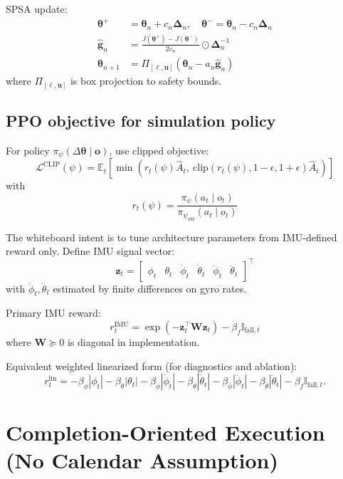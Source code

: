 \documentclass[11pt]{article}
\begin{document}
SPSA update:
\begin{align}
\boldsymbol{\theta}^{+}&=\boldsymbol{\theta}_n+c_n\boldsymbol{\Delta}_n,\quad
\boldsymbol{\theta}^{-}=\boldsymbol{\theta}_n-c_n\boldsymbol{\Delta}_n\\
\hat{\mathbf{g}}_n&=\frac{J(\boldsymbol{\theta}^{+})-J(\boldsymbol{\theta}^{-})}{2c_n}\odot\boldsymbol{\Delta}_n^{-1}\\
\boldsymbol{\theta}_{n+1}&=\Pi_{[\boldsymbol{\ell},\mathbf{u}]}\!\left(\boldsymbol{\theta}_n-a_n\hat{\mathbf{g}}_n\right)
\end{align}
where $\Pi_{[\boldsymbol{\ell},\mathbf{u}]}$ is box projection to safety bounds.

\subsection*{PPO objective for simulation policy}

For policy $\pi_{\psi}(\Delta\boldsymbol{\theta}\mid \mathbf{o})$, use clipped objective:
\begin{equation}
\mathcal{L}^{\mathrm{CLIP}}(\psi)=
\mathbb{E}_t\left[
\min\left(
r_t(\psi)\hat{A}_t,\ 
\mathrm{clip}(r_t(\psi),1-\epsilon,1+\epsilon)\hat{A}_t
\right)
\right]
\end{equation}
with
\[
r_t(\psi)=\frac{\pi_{\psi}(a_t\mid o_t)}{\pi_{\psi_{\mathrm{old}}}(a_t\mid o_t)}
\]

The whiteboard intent is to tune architecture parameters from IMU-defined reward only. Define IMU signal vector:
\[
\mathbf{z}_t=
\begin{bmatrix}
\phi_t & \theta_t & \dot{\phi}_t & \dot{\theta}_t & \ddot{\phi}_t & \ddot{\theta}_t
\end{bmatrix}^{\top}
\]
with $\ddot{\phi}_t,\ddot{\theta}_t$ estimated by finite differences on gyro rates.

Primary IMU reward:
\[
r_t^{\mathrm{IMU}}=\exp\!\left(-\mathbf{z}_t^{\top}\mathbf{W}\mathbf{z}_t\right)-\beta_f\mathbb{I}_{\mathrm{fall},t}
\]
where $\mathbf{W}\succeq 0$ is diagonal in implementation.

Equivalent weighted linearized form (for diagnostics and ablation):
\[
r_t^{\mathrm{lin}}=
-\beta_{\phi}|\phi_t|
-\beta_{\theta}|\theta_t|
-\beta_{\dot{\phi}}|\dot{\phi}_t|
-\beta_{\dot{\theta}}|\dot{\theta}_t|
-\beta_{\ddot{\phi}}|\ddot{\phi}_t|
-\beta_{\ddot{\theta}}|\ddot{\theta}_t|
-\beta_f\mathbb{I}_{\mathrm{fall},t}.
\]

\section{Completion-Oriented Execution (No Calendar Assumption)}
\end{document}
